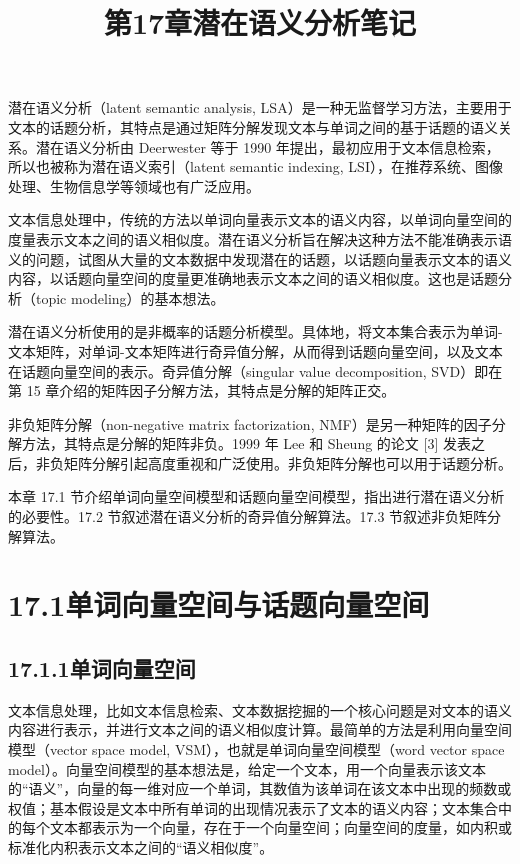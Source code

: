 \documentclass[UTF8,12pt,a4paper,fontset=fandol]{ctexart}
\title{第17章\quad 潜在语义分析笔记}
\author{}
\date{}
\begin{document}
\maketitle

潜在语义分析（latent semantic analysis, LSA）是一种无监督学习方法，主要用于文本的话题分析，其特点是通过矩阵分解发现文本与单词之间的基于话题的语义关系。潜在语义分析由 Deerwester 等于 1990 年提出，最初应用于文本信息检索，所以也被称为潜在语义索引（latent semantic indexing, LSI），在推荐系统、图像处理、生物信息学等领域也有广泛应用。

文本信息处理中，传统的方法以单词向量表示文本的语义内容，以单词向量空间的度量表示文本之间的语义相似度。潜在语义分析旨在解决这种方法不能准确表示语义的问题，试图从大量的文本数据中发现潜在的话题，以话题向量表示文本的语义内容，以话题向量空间的度量更准确地表示文本之间的语义相似度。这也是话题分析（topic modeling）的基本想法。

潜在语义分析使用的是非概率的话题分析模型。具体地，将文本集合表示为单词-文本矩阵，对单词-文本矩阵进行奇异值分解，从而得到话题向量空间，以及文本在话题向量空间的表示。奇异值分解（singular value decomposition, SVD）即在第 15 章介绍的矩阵因子分解方法，其特点是分解的矩阵正交。

非负矩阵分解（non-negative matrix factorization, NMF）是另一种矩阵的因子分解方法，其特点是分解的矩阵非负。1999 年 Lee 和 Sheung 的论文 [3] 发表之后，非负矩阵分解引起高度重视和广泛使用。非负矩阵分解也可以用于话题分析。

本章 17.1 节介绍单词向量空间模型和话题向量空间模型，指出进行潜在语义分析的必要性。17.2 节叙述潜在语义分析的奇异值分解算法。17.3 节叙述非负矩阵分解算法。

\section*{17.1\quad 单词向量空间与话题向量空间}

\subsection*{17.1.1\quad 单词向量空间}

文本信息处理，比如文本信息检索、文本数据挖掘的一个核心问题是对文本的语义内容进行表示，并进行文本之间的语义相似度计算。最简单的方法是利用向量空间模型（vector space model, VSM），也就是单词向量空间模型（word vector space model）。向量空间模型的基本想法是，给定一个文本，用一个向量表示该文本的“语义”，向量的每一维对应一个单词，其数值为该单词在该文本中出现的频数或权值；基本假设是文本中所有单词的出现情况表示了文本的语义内容；文本集合中的每个文本都表示为一个向量，存在于一个向量空间；向量空间的度量，如内积或标准化内积表示文本之间的“语义相似度”。
\end{document}
